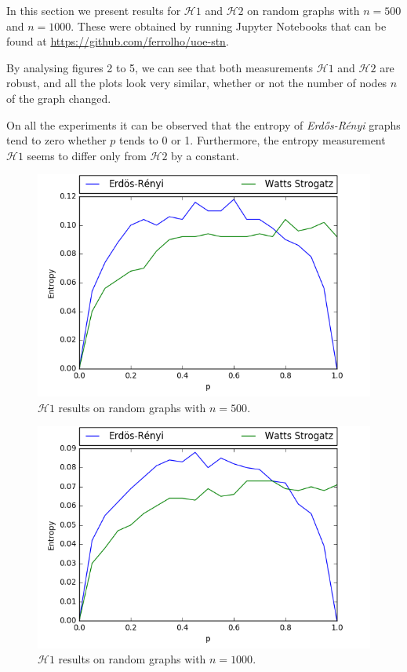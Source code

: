\documentclass[journal]{IEEEtran}
\begin{document}
In this section we present results for $\mathcal{H}1$ and $\mathcal{H}2$ on random graphs with $n = 500$ and $n = 1000$. These were obtained by running Jupyter Notebooks that can be found at \url{https://github.com/ferrolho/uoe-stn}.

\bigskip

By analysing figures 2 to 5, we can see that both measurements $\mathcal{H}1$ and $\mathcal{H}2$ are robust, and all the plots look very similar, whether or not the number of nodes $n$ of the graph changed.

\bigskip

On all the experiments it can be observed that the entropy of \textit{Erdős-Rényi} graphs tend to zero whether $p$ tends to 0 or 1. Furthermore, the entropy measurement $\mathcal{H}1$ seems to differ only from $\mathcal{H}2$ by a constant.

\bigskip

\begin{figure}[ht]
    \centering
    \includegraphics[width=\linewidth]{res/entropy1/experiment_n500.png}
    \caption{$\mathcal{H}1$ results on random graphs with $n = 500$.}
\end{figure}

\begin{figure}[ht]
    \centering
    \includegraphics[width=\linewidth]{res/entropy1/experiment_n1000.png}
    \caption{$\mathcal{H}1$ results on random graphs with $n = 1000$.}
\end{figure}
\end{document}
